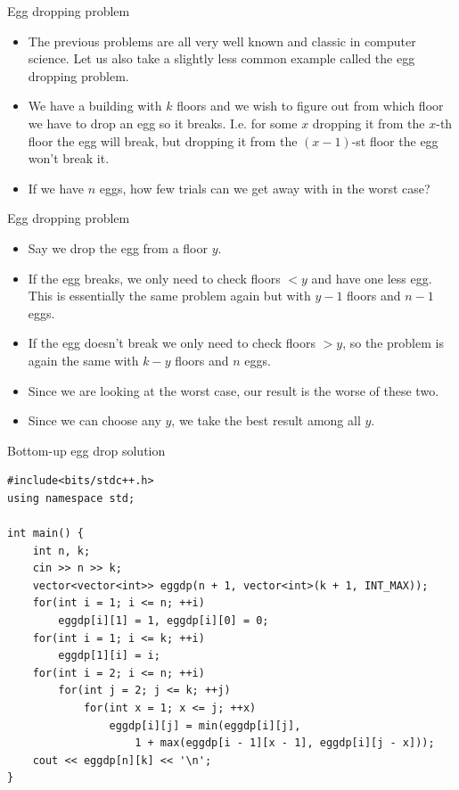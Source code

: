 \documentclass{beamer}
\begin{document}
\begin{frame}[plain]{Egg dropping problem}
    \vspace{10pt}

    \begin{itemize}
        \item The previous problems are all very well known and classic in computer science. Let us also take a slightly less common example called the egg dropping problem.
        
        \item We have a building with $k$ floors and we wish to figure out from which floor we have to drop an egg so it breaks. I.e. for some $x$ dropping it from the $x$-th floor the egg will break, but dropping it from the $(x-1)$-st floor the egg won't break it.
        
        \item If we have $n$ eggs, how few trials can we get away with in the worst case?
    \end{itemize}
\end{frame}

\begin{frame}[plain]{Egg dropping problem}
    \vspace{10pt}

    \begin{itemize}
        \item Say we drop the egg from a floor $y$. 
        
        \item If the egg breaks, we only need to check floors $< y$ and have one less egg. This is essentially the same problem again but with $y - 1$ floors and $n - 1$ eggs.
        
        \item If the egg doesn't break we only need to check floors $> y$, so the problem is again the same with $k - y$ floors and $n$ eggs.
        
        \item Since we are looking at the worst case, our result is the worse of these two.
        
        \item Since we can choose any $y$, we take the best result among all $y$.
    \end{itemize}
\end{frame}

\begin{frame}{Bottom-up egg drop solution}
    \begin{verbatim}
#include<bits/stdc++.h>
using namespace std;

int main() {
    int n, k;
    cin >> n >> k;
    vector<vector<int>> eggdp(n + 1, vector<int>(k + 1, INT_MAX));
    for(int i = 1; i <= n; ++i)
        eggdp[i][1] = 1, eggdp[i][0] = 0;
    for(int i = 1; i <= k; ++i)
        eggdp[1][i] = i;
    for(int i = 2; i <= n; ++i)
        for(int j = 2; j <= k; ++j)
            for(int x = 1; x <= j; ++x)
                eggdp[i][j] = min(eggdp[i][j], 
                    1 + max(eggdp[i - 1][x - 1], eggdp[i][j - x]));
    cout << eggdp[n][k] << '\n';
}
    \end{verbatim}
\end{frame}

\end{document}
